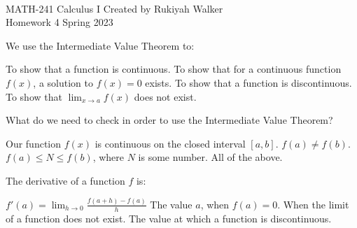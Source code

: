 \documentclass[addpoints, 12pt]{exam}%
\newcommand{\spc}{\vspace*{0.5cm}}
\begin{document}
\noindent \hrulefill \\
	MATH-241 Calculus I \hfill Created by Rukiyah Walker\\
	Homework 4 \hfill Spring 2023\\ \vspace*{-1cm}
 
	\noindent\hrulefill


\begin{questions}

\vspace*{1cm}

\question[1]

We use the Intermediate Value Theorem to: 

\begin{choices}
\choice To show that a function is continuous.
\CorrectChoice To show that for a continuous function $f(x)$, a solution to $f(x) = 0$ exists.
\choice To show that a function is discontinuous. 
\choice To show that $\lim_{x \to a} f(x)$ does not exist.
\end{choices}

\spc

\question[1]

What do we need to check in order to use the Intermediate Value Theorem?

\begin{choices}
\choice Our function $f(x)$ is continuous on the closed interval $[a, b]$.
\choice $f(a) \neq f(b)$.
\choice $f(a) \leq N \leq f(b)$, where $N$ is some number. 
\CorrectChoice All of the above.
\end{choices}

\spc

\question[1]

The derivative of a function $f$ is:

\begin{choices}
\CorrectChoice $f'(a) = \lim_{h \to 0} \frac{f(a + h) - f(a)}{h}$
\choice The value $a$, when $f(a) = 0$.
\choice When the limit of a function does not exist.
\choice The value at which a function is discontinuous. 
\end{choices}


\end{questions}
\end{document}
